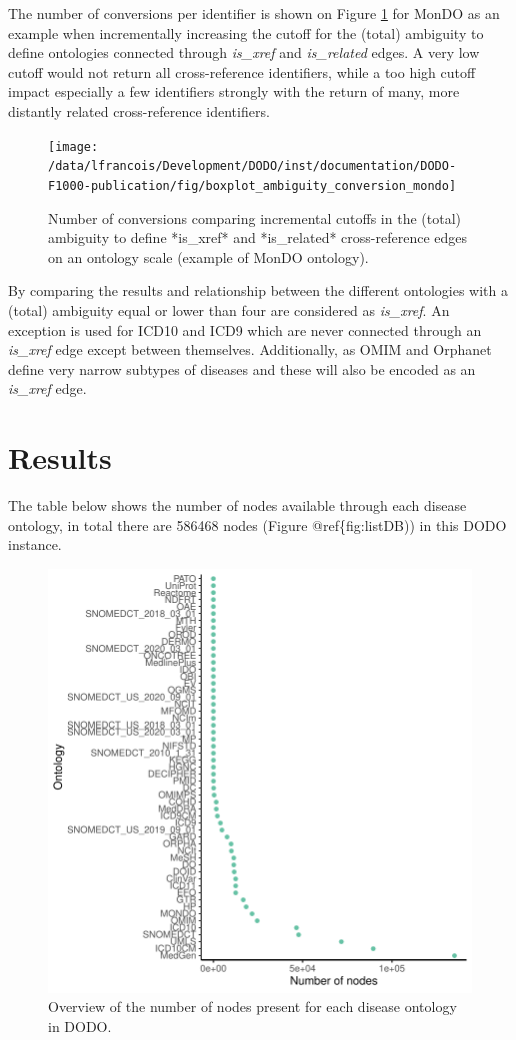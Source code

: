 \documentclass[9pt,a4paper,]{extarticle}
\begin{document}
The number of conversions per identifier is shown on Figure \ref{fig:boxplotAmbiguity} for MonDO as an example when incrementally increasing the cutoff for the (total) ambiguity to define ontologies connected through \emph{is\_xref} and \emph{is\_related} edges. A very low cutoff would not return all cross-reference identifiers, while a too high cutoff impact especially a few identifiers strongly with the return of many, more distantly related cross-reference identifiers.

\begin{figure}

{\centering \texttt{[image: /data/lfrancois/Development/DODO/inst/documentation/DODO-F1000-publication/fig/boxplot\_ambiguity\_conversion\_mondo]} 

}

\caption{Number of conversions comparing incremental cutoffs in the (total) ambiguity to define *is\_xref* and *is\_related* cross-reference edges on an ontology scale (example of MonDO ontology).}\label{fig:boxplotAmbiguity}
\end{figure}

By comparing the results and relationship between the different ontologies with a (total) ambiguity equal or lower than four are considered as \emph{is\_xref}. An exception is used for ICD10 and ICD9 which are never connected through an \emph{is\_xref} edge except between themselves. Additionally, as OMIM and Orphanet define very narrow subtypes of diseases and these will also be encoded as an \emph{is\_xref} edge.

\hypertarget{results}{%
\section{Results}\label{results}}

The table below shows the number of nodes available through each disease ontology, in total there are 586468 nodes (Figure @ref\{fig:listDB)) in this DODO instance.

\begin{figure}

{\centering \includegraphics[width=0.5\linewidth,height=0.75\textheight]{DODO-F1000-publication_files/figure-latex/listDB-1} 

}

\caption{Overview of the number of nodes present for each disease ontology in DODO.}\label{fig:listDB}
\end{figure}
\end{document}
